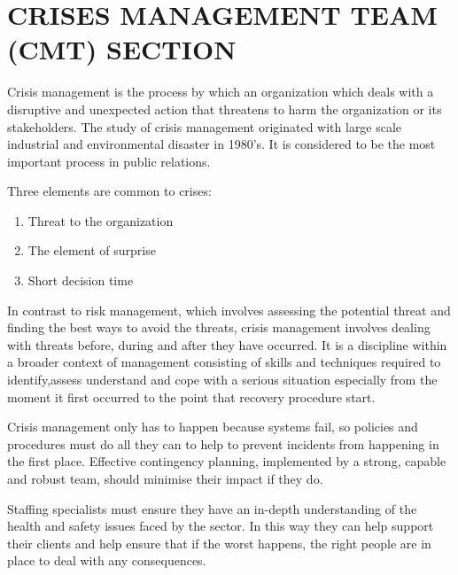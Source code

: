 \chapter{CRISES MANAGEMENT TEAM (CMT) SECTION}

\onehalfspacing

Crisis management is the process by which an organization which
deals with a disruptive and unexpected action that threatens to harm
the organization or its stakeholders. The study of crisis management
originated with large scale industrial and environmental disaster in
1980’s. It is considered to be the most important process in public
relations.

\vspace{1em}


\noindent Three elements are common to crises:

\begin{enumerate}

\item Threat to the organization

\item The element of surprise

\item Short decision time

\end{enumerate}


\vspace{1em}

In contrast to risk management, which involves assessing the
potential threat and finding the best ways to avoid the threats, crisis
management involves dealing with threats before, during and after
they have occurred. It is a discipline within a broader context of
management consisting of skills and techniques required to identify,assess understand and cope with a serious situation especially from
the moment it first occurred to the point that recovery procedure start.

\vspace{1em}

Crisis management only has to happen because systems fail, so policies and procedures must do all 
they can to help to prevent incidents from happening in the first place. Effective contingency planning,
implemented by a strong, capable and robust team, should minimise their impact if they do.

\vspace{2em}

Staffing specialists must ensure they have an in-depth understanding of the health and 
safety issues faced by the sector. In this way they can help support their clients and 
help ensure that if the worst happens, the right people are in place to deal with any consequences.


